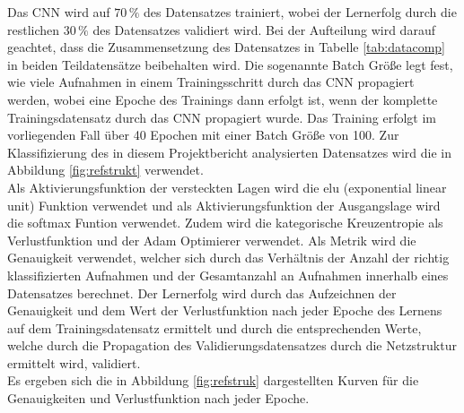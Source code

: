 Das CNN wird auf $70\,\%$ des Datensatzes trainiert, wobei der Lernerfolg durch die restlichen $30\,\%$ des Datensatzes validiert wird. Bei der Aufteilung wird darauf geachtet, dass die Zusammensetzung des Datensatzes in Tabelle \ref{tab:datacomp} in beiden Teildatensätze beibehalten wird. Die sogenannte Batch Größe legt fest, wie viele Aufnahmen in einem Trainingsschritt durch das CNN propagiert werden, wobei eine Epoche des Trainings dann erfolgt ist, wenn der komplette Trainingsdatensatz durch das CNN propagiert wurde. Das Training erfolgt im vorliegenden Fall über 40 Epochen mit einer Batch Größe von 100. Zur Klassifizierung des in diesem Projektbericht analysierten Datensatzes wird die in Abbildung \ref{fig:refstrukt} verwendet. \\
Als Aktivierungsfunktion der versteckten Lagen wird die elu (exponential linear unit) Funktion verwendet und als Aktivierungsfunktion der Ausgangslage wird die softmax Funtion verwendet. Zudem wird die kategorische Kreuzentropie als Verlustfunktion und der Adam Optimierer \cite{Adam} verwendet. Als Metrik wird die Genauigkeit verwendet, welcher sich durch das Verhältnis der Anzahl der richtig klassifizierten Aufnahmen und der Gesamtanzahl an Aufnahmen innerhalb eines Datensatzes berechnet. Der Lernerfolg wird durch das Aufzeichnen der Genauigkeit und dem Wert der Verlustfunktion nach jeder Epoche des Lernens auf dem Trainingsdatensatz ermittelt und durch die entsprechenden Werte, welche durch die Propagation des Validierungsdatensatzes durch die Netzstruktur ermittelt wird, validiert.\\
Es ergeben sich die in Abbildung \ref{fig:refstruk} dargestellten Kurven für die Genauigkeiten und Verlustfunktion nach jeder Epoche. 
\setcounter{figure}{2}
